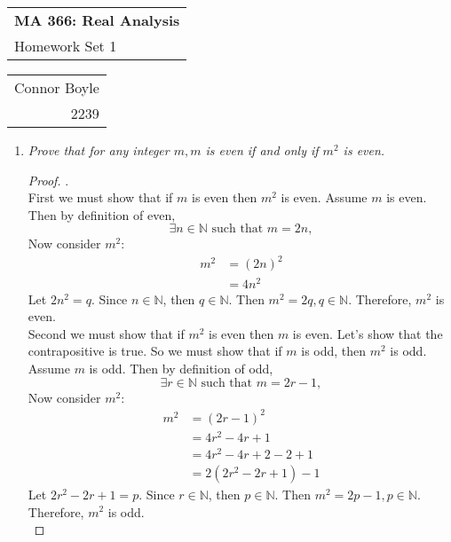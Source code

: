 \documentclass{amsart}
\def\name{Connor Boyle} %
\def\CM{2239} %
\def\hwnum{1} %
\begin{document}
\noindent
\thispagestyle{firststyle}
\begin{tabular}{l}
{\LARGE \textbf{MA 366: Real Analysis} }\\
{\Large Homework Set \hwnum}
\end{tabular} \hfill \begin{tabular}{r}
                        \name \\
                        \CM
                        \end{tabular}

\noindent \hrulefill

\begin{enumerate}[1.]
\item \emph{Prove that for any integer $m, m$ is even if and only if $m^2$ is even.}
\begin{proof} .\\

First we must show that if $m$ is even then $m^2$ is even.
Assume $m$ is even. Then by definition of even, 
\[\exists n\in\mathbb{N} \text{ such that } m = 2n, \]
Now consider $m^2$:
\begin{align*} 
    m^2 &= (2n)^2 \\
    &= 4n^2
\end{align*}
Let $2n^2 = q$. Since $n\in\mathbb{N}$, then $q\in\mathbb{N}$. 
Then $m^2 = 2q, q\in\mathbb{N}$. Therefore, $m^2$ is even. \\

Second we must show that if $m^2$ is even then $m$ is even.
Let's show that the contrapositive is true.
So we must show that if $m$ is odd, then $m^2$ is odd.
Assume $m$ is odd. Then by definition of odd, 
\[\exists r\in\mathbb{N} \text{ such that } m = 2r - 1, \]
Now consider $m^2$:
\begin{align*}
    m^2 &= (2r - 1)^2 \\
    &= 4r^2 - 4r + 1 \\
    &= 4r^2 - 4r + 2 - 2 + 1 \\
    &= 2(2r^2 -2r + 1) - 1
\end{align*}
Let $2r^2 - 2r + 1 = p$. Since $r\in\mathbb{N}$, then $p\in\mathbb{N}$.
Then $m^2 = 2p - 1, p\in\mathbb{N}$. Therefore, $m^2$ is odd. \\
\end{proof}

\newpage


\end{enumerate}
\end{document}
